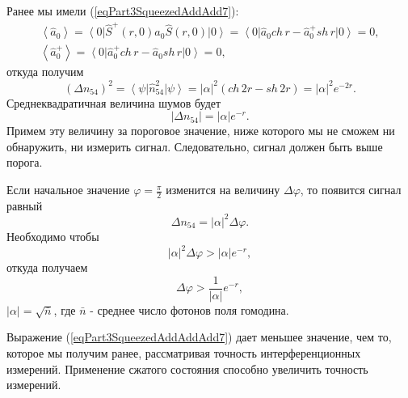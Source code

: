 Ранее мы имели (\ref{eqPart3SqueezedAddAdd7}):
\begin{eqnarray}
\left<\hat{a}_0\right> = 
\left<0\right|
\hat{S}^{+}\left(r, 0\right)
\hat{a}_0
\hat{S}\left(r, 0\right)
\left|0\right> = 
\left<0\right|
\hat{a}_0 ch\,r - \hat{a}_0^{+} sh\,r
\left|0\right> = 0,
\nonumber \\
\left<\hat{a}_0^{+}\right> = 
\left<0\right|
\hat{a}_0^{+} ch\,r - \hat{a}_0 sh\,r
\left|0\right> = 0,
\nonumber
\end{eqnarray}
откуда получим
\begin{equation}
\left(\Delta n_{54}\right)^2 = 
\left<\psi\right|\hat{n}_{54}^2\left|\psi\right> =
\left|\alpha\right|^2\left(
ch\,2r - sh\,2r
\right) = 
\left|\alpha\right|^2 e^{-2 r}.
\nonumber
\end{equation}
Среднеквадратичная величина шумов будет 
\[
\left|\Delta n_{54}\right| = 
\left|\alpha\right| e^{- r}.
\]
Примем эту величину за пороговое значение, ниже которого мы не сможем
ни обнаружить, ни измерить сигнал. Следовательно, сигнал должен быть
выше порога.

Если начальное значение $\varphi=\frac{\pi}{2}$ изменится на величину $\Delta
\varphi$, то появится сигнал равный
\[
\Delta n_{54} = 
\left|\alpha\right|^2
\Delta \varphi.
\]
Необходимо чтобы 
\[
\left|\alpha\right|^2
\Delta \varphi > 
\left|\alpha\right|
e^{-r},
\]
откуда получаем
\begin{equation}
\Delta \varphi >
\frac{1}{\left|\alpha\right|} e^{-r},
\label{eqPart3SqueezedAddAddAdd7}
\end{equation}
$\left|\alpha\right| = \sqrt{\bar{n}}$, где $\bar{n}$ - среднее число
фотонов поля гомодина.

Выражение (\ref{eqPart3SqueezedAddAddAdd7}) дает меньшее значение, чем
то, которое мы получим ранее, рассматривая точность интерференционных
измерений. Применение сжатого состояния способно увеличить точность
измерений. 
